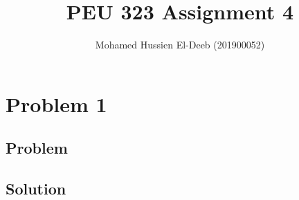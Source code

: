 \documentclass[12pt]{article}
\title{PEU 323 Assignment 4}
\author{Mohamed Hussien El-Deeb (201900052)}
\date{}
\begin{document}
\maketitle
\tableofcontents

\section{Problem 1}

\subsection{Problem}

\subsection{Solution}

\newpage



\nocite{El-Deeb_PEU-323_Assignments}
\end{document}
